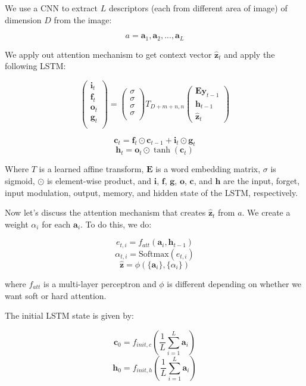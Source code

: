 \documentclass[a4paper]{article}
\begin{document}
We use a CNN to extract $L$ descriptors (each from different area of image) of
dimension $D$ from the image:

$$
a = {\mathbf{a}_1, \mathbf{a}_2, ..., \mathbf{a}_L}
$$

We apply out attention mechanism to get context vector $\hat{\mathbf{z}}_t$
and apply the following LSTM:

$$
\begin{pmatrix}
  \mathbf{i}_t \\
  \mathbf{f}_t \\
  \mathbf{o}_t \\
  \mathbf{g}_t \\
\end{pmatrix}
= \begin{pmatrix}
  \sigma \\
  \sigma \\
  \sigma \\
  \sigma \\
\end{pmatrix}
T_{D + m + n, n}
\begin{pmatrix}
  \mathbf{E} \mathbf{y}_{t-1} \\
  \mathbf{h}_{t-1} \\
  \hat{\mathbf{z}}_t
\end{pmatrix}
$$

$$
\mathbf{c}_t = \mathbf{f}_t \odot \mathbf{c}_{t-1} + \mathbf{i}_t \odot
\mathbf{g}_{t}
$$
$$
\mathbf{h}_t = \mathbf{o}_t \odot \tanh(\mathbf{c}_{t})
$$

Where $T$ is a learned affine transform, $\mathbf{E}$ is a word embedding
matrix, $\sigma$ is sigmoid, $\odot$ is element-wise product, and $\mathbf{i}$,
$\mathbf{f}$, $\mathbf{g}$, $\mathbf{o}$, $\mathbf{c}$, and $\mathbf{h}$ are the
input, forget, input modulation, output, memory, and hidden state of the LSTM,
respectively.

Now let's discuss the attention mechanism that creates $\hat{\mathbf{z}}_t$ from
$a$. We create a weight $\alpha_i$ for each $\mathbf{a}_i$. To do this,
we do:

$$
e_{t,i} = f_{att}(\mathbf{a}_i, \mathbf{h}_{t-1})
$$
$$
\alpha_{t,i} = \textrm{Softmax}(e_{t,i})
$$
$$
\hat{\mathbf{z}} = \phi(\{\mathbf{a}_i\}, \{\alpha_i\})
$$

where $f_{att}$ is a multi-layer perceptron and $\phi$ is different depending
on whether we want soft or hard attention.

The initial LSTM state is given by:

$$
\mathbf{c}_0 = f_{init,c}(\frac{1}{L} \sum_{i=1}^{L}{\mathbf{a}_i})
$$
$$
\mathbf{h}_0 = f_{init,h}(\frac{1}{L} \sum_{i=1}^{L}{\mathbf{a}_i})
$$
\end{document}
